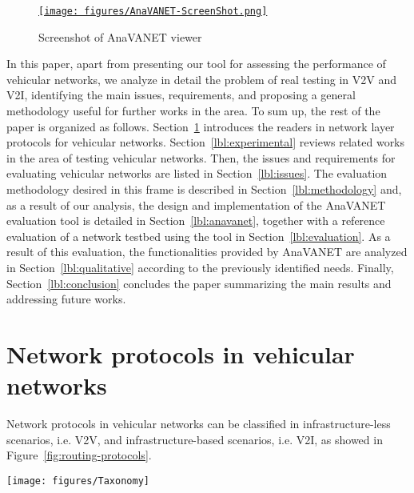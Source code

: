 \documentclass[fonts]{icst}
\begin{document}
\begin{figure}[htbp]
  \begin{center}
    \href{http://anavanet.net/demo-vienna/?analysis=1264516500}{
    \texttt{[image: figures/AnaVANET-ScreenShot.png]}} 
  \caption{Screenshot of AnaVANET viewer}
  \label{fig:screenshot}
  \end{center}
\end{figure}


In this paper, apart from presenting our tool for assessing the performance of vehicular networks, we analyze in detail the problem of real testing in V2V and V2I, identifying the main issues, requirements, and proposing a general methodology useful for further works in the area. To sum up, the rest of the paper is organized as follows.  
Section~\ref{lbl:background} introduces the readers in network layer protocols for vehicular networks. Section~\ref{lbl:experimental} reviews related works in the area of testing vehicular networks. Then, the issues and requirements for evaluating vehicular networks are listed in Section~\ref{lbl:issues}. 
The evaluation methodology desired in this frame is described in Section~\ref{lbl:methodology} and, as a result of our analysis, the design and implementation of the AnaVANET evaluation tool is detailed in Section~\ref{lbl:anavanet}, together with a reference evaluation of a network testbed using the tool in Section~\ref{lbl:evaluation}. As a result of this evaluation, the functionalities provided by AnaVANET are analyzed in Section~\ref{lbl:qualitative} according to the previously identified needs. Finally, Section~\ref{lbl:conclusion} concludes the paper summarizing the main results and addressing future works. 








\section{Network protocols in vehicular networks}
\label{lbl:background}

Network protocols in vehicular networks can be classified in
infrastructure-less scenarios, i.e. V2V,  and infrastructure-based scenarios, i.e. V2I, as showed in Figure~\ref{fig:routing-protocols}. 

\begin{figure*}[htbp]
  \begin{center}
    \texttt{[image: figures/Taxonomy]}
  \caption{Network protocols in vehicular networks}
  \label{fig:routing-protocols}
  \end{center}
\end{figure*}
\end{document}
